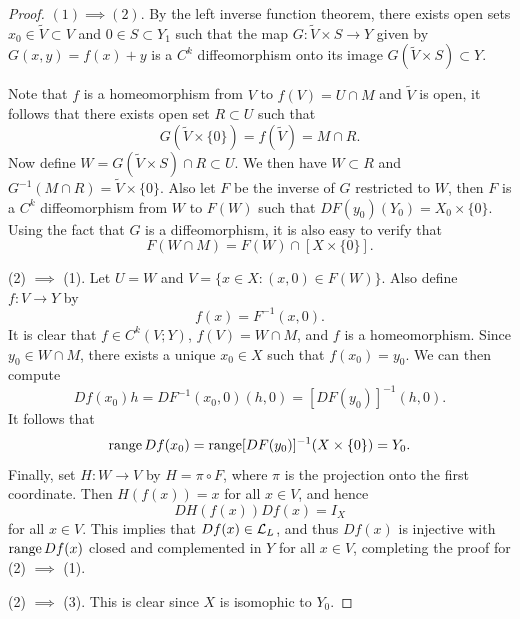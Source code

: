 \documentclass[a4paper]{article}
\begin{document}
\begin{proof}
  $(1) \implies (2)$. By the left inverse function theorem,
  there exists open sets
  $x_0 \in \tilde{V} \subset V$ and $0 \in S \subset Y_1$
  such that the map $G : \tilde{V} \times S \to Y$ given by
  $G(x, y) = f(x) + y$ is a $C^k$ diffeomorphism onto its image
  $G(\tilde{V} \times S) \subset Y$.

  Note that $f$ is a homeomorphism from $V$ to $f(V) = U \cap M$ and
  $\tilde{V}$ is open, it follows that there exists open set $R \subset U$
  such that
  \[
    G(\tilde{V} \times \{0\}) = f(\tilde{V}) = M \cap R.
  \]
  Now define $W = G(\tilde{V} \times S) \cap R \subset U$. We then have $W
  \subset R$ and $G^{-1} (M \cap R) = \tilde{V} \times \{0\}$. Also let
  $F$ be the inverse of $G$ restricted to $W$, then $F$ is a $C^k$
  diffeomorphism from $W$ to $F(W)$ such that $DF(y_0)(Y_0) = X_0 \times
  \{0\}$. Using the fact that $G$ is a diffeomorphism, it is also easy to
  verify that
  \[
    F(W \cap M) = F(W) \cap [X \times \{0\}].
  \]

  (2) $\implies$ (1). Let $U = W$ and $V = \{x \in X: (x, 0)
    \in F(W)\}$. Also define $f : V \to Y$ by
  \[
    f(x) = F^{-1} (x, 0).
  \]
  It is clear that $f \in C^k(V; Y)$, $f(V) = W \cap M$, and $f$ is a
  homeomorphism. Since $y_0 \in W \cap M$, there exists a unique $x_0 \in
  X$ such that $f(x_0) = y_0$. We can then compute
  \[
    Df(x_0) h = DF^{-1} (x_0, 0) (h, 0) = [DF(y_0)]^{-1} (h, 0).
  \]
  It follows that
  \[
    \operatorname{range} Df(x_0) = \operatorname{range} [DF(y_0)]^{-1} (X \times \{0\}) = Y_0.
  \]
  Finally, set $H : W \to V$ by $H = \pi \circ F$, where $\pi$ is the
  projection onto the first coordinate. Then $H(f(x)) = x$ for all $x \in
  V$, and hence
  \[
    DH(f(x)) Df(x) = I_X
  \]
  for all $x \in V$. This implies that $Df(x) \in \mathcal{L}_L$, and thus $Df(x)$
  is injective with $\operatorname{range} Df(x)$ closed and complemented in $Y$ for all $x
  \in V$, completing the proof for (2) $\implies$ (1).

  (2) $\implies$ (3). This is clear since $X$ is isomophic
  to $Y_0$.
\end{proof}
\end{document}
